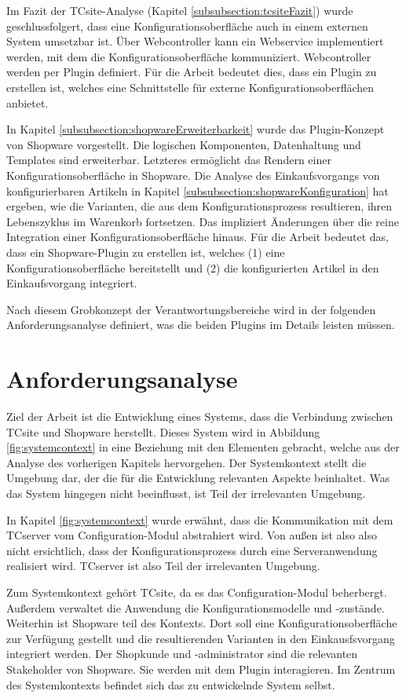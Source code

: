 \documentclass[11pt, a4paper, titlepage, listof=totoc, bibliography=totoc, index=totoc, twoside, openright, headings=normal]{scrreprt}
\begin{document}
Im Fazit der TCsite-Analyse (Kapitel \ref{subsubsection:tcsiteFazit}) wurde
geschlussfolgert, dass eine Konfigurationsoberfläche auch in einem externen System umsetzbar ist. Über Webcontroller kann ein Webservice implementiert werden, mit dem die Konfigurationsoberfläche kommuniziert. Webcontroller werden per Plugin definiert. Für die Arbeit bedeutet dies, dass ein Plugin zu erstellen ist, welches eine Schnittstelle für externe Konfigurationsoberflächen anbietet.

In Kapitel \ref{subsubsection:shopwareErweiterbarkeit} wurde das Plugin-Konzept von Shopware vorgestellt. Die logischen Komponenten, Datenhaltung und Templates sind erweiterbar. Letzteres ermöglicht das Rendern einer Konfigurationsoberfläche in Shopware. Die Analyse des Einkaufsvorgangs von konfigurierbaren Artikeln in Kapitel \ref{subsubsection:shopwareKonfiguration} hat ergeben, wie die Varianten, die aus dem Konfigurationsprozess resultieren, ihren Lebenszyklus im Warenkorb fortsetzen. Das impliziert Änderungen über die reine Integration einer Konfigurationsoberfläche hinaus. Für die Arbeit bedeutet das, dass ein Shopware-Plugin zu erstellen ist, welches (1) eine Konfigurationsoberfläche bereitstellt und (2) die konfigurierten Artikel in den Einkaufsvorgang integriert.

Nach diesem Grobkonzept der Verantwortungsbereiche wird in der folgenden Anforderungsanalyse definiert, was die beiden Plugins im Details leisten müssen.
\pagebreak

\section{Anforderungsanalyse}
Ziel der Arbeit ist die Entwicklung eines Systems, dass die Verbindung zwischen TCsite und Shopware herstellt. Dieses System wird in Abbildung \ref{fig:systemcontext} in eine Beziehung mit den Elementen gebracht, welche aus der Analyse des vorherigen Kapitels hervorgehen. Der Systemkontext stellt die Umgebung dar, der die für die Entwicklung relevanten Aspekte beinhaltet. Was das System hingegen nicht beeinflusst, ist Teil der irrelevanten Umgebung.

In Kapitel \ref{fig:systemcontext} wurde erwähnt, dass die Kommunikation mit dem TCserver vom Configuration-Modul abstrahiert wird. Von außen ist also also nicht ersichtlich, dass der Konfigurationsprozess durch eine Serveranwendung realisiert wird. TCserver ist also Teil der irrelevanten Umgebung.

Zum Systemkontext gehört TCsite, da es das Configuration-Modul beherbergt. Außerdem verwaltet die Anwendung die Konfigurationsmodelle und -zustände. Weiterhin ist Shopware teil des Kontexts. Dort soll eine Konfigurationsoberfläche zur Verfügung gestellt und die resultierenden Varianten in den Einkausfsvorgang integriert werden. Der Shopkunde und -administrator sind die relevanten Stakeholder von Shopware. Sie werden mit dem Plugin interagieren.
Im Zentrum des Systemkontexts befindet sich das zu entwickelnde System selbst.
\end{document}

